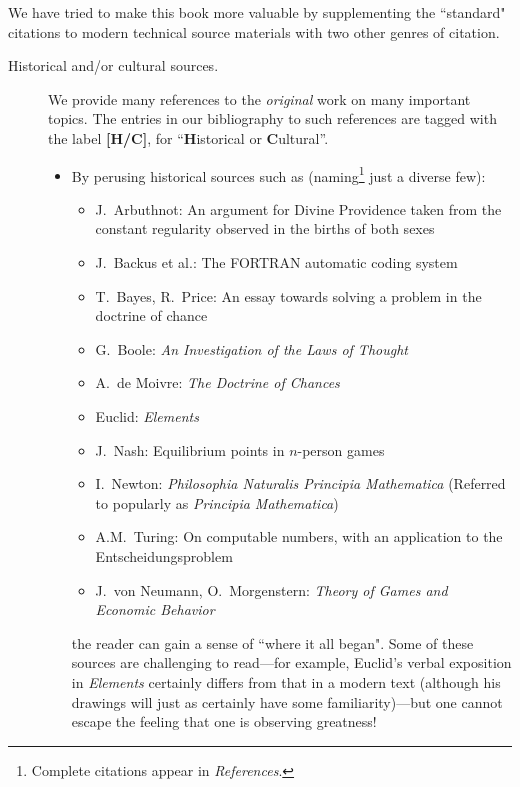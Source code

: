 \noindent
We have tried to make this book more valuable by supplementing the ``standard" citations to modern technical source materials with two other genres of citation.
\begin{description}
\item[{\sc Historical and/or cultural sources}.]
We provide many references to the {\em original} work on many important topics.  The entries in our bibliography to such references are tagged with the label {\bf [H/C]}, for ``{\bf H}istorical or {\bf C}ultural''.
  \begin{itemize}
  \item
By perusing historical sources such as (naming\footnote{Complete citations appear in {\it References}.} just a diverse few): 

\medskip

     \begin{itemize}
     \item
J.~Arbuthnot: An argument for Divine Providence taken from the constant regularity observed in the births of both sexes
     \medskip\item
J.~Backus et al.: The FORTRAN automatic coding system
      \medskip\item
T.~Bayes, R.~Price: An essay towards solving a problem in the doctrine of chance
      \medskip\item
G.~Boole: {\it An Investigation of the Laws of Thought}   
     \medskip\item
A.~de Moivre: {\it The Doctrine of Chances}
     \medskip\item
Euclid: {\it Elements} 
    \medskip\item
J.~Nash: Equilibrium points in $n$-person games
    \medskip\item
I.~Newton: {\it Philosophia Naturalis Principia Mathematica}
(Referred to popularly as {\it Principia Mathematica})
    \medskip\item
A.M.~Turing: On computable numbers, with an application to the Entscheidungsproblem
    \medskip\item
J.~von Neumann, O.~Morgenstern: {\it Theory of Games and Economic Behavior}
    \end{itemize}
\smallskip

the reader can gain a sense of ``where it all began".  Some of these sources are challenging to read---for example, Euclid's verbal exposition in {\it Elements} certainly differs from that in a modern text (although his drawings will just as certainly have some familiarity)---but one cannot escape the feeling that one is observing greatness!


\end{itemize}
\end{description}
